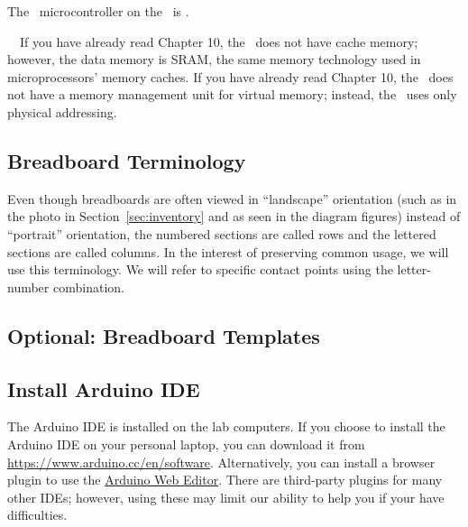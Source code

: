 The \microcontroller\ microcontroller on the \developmentboard\ is \microcontrollerprocessorandmemory.
\microcontrollerintegertiming\
\microcontrollerdivisionandfloats\

\memorymodeldescription\
\pipelinedescription\
If you have already read Chapter 10, the \microcontroller\ does not have cache memory;
however, the data memory is SRAM, the same memory technology used in microprocessors' memory caches.
If you have already read Chapter 10, the \microcontroller\ does not have a memory management unit for virtual memory;
instead, the \microcontroller\ uses only physical addressing.

\subsection{Breadboard Terminology}

    \begin{description}
    \end{description}

    Even though breadboards are often viewed in ``landscape'' orientation (such as in the photo in Section~\ref{sec:inventory} and as seen in the diagram figures) instead of ``portrait'' orientation, the numbered sections are called rows and the lettered sections are called columns.
    In the interest of preserving common usage, we will use this terminology.
    We will refer to specific contact points using the letter-number combination.

\subsection{Optional: Breadboard Templates}                    



\subsection{Install Arduino IDE}

    The Arduino IDE is installed on the lab computers.
    If you choose to install the Arduino IDE on your personal laptop, you can download it from
    \url{https://www.arduino.cc/en/software}.
    Alternatively, you can install a browser plugin to use the
    \href{https://create.arduino.cc/projecthub/Arduino_Genuino/getting-started-with-arduino-web-editor-on-various-platforms-4b3e4a}{Arduino Web Editor}.
    There are third-party plugins for many other IDEs; however, using these may limit our ability to help you if your have difficulties.

